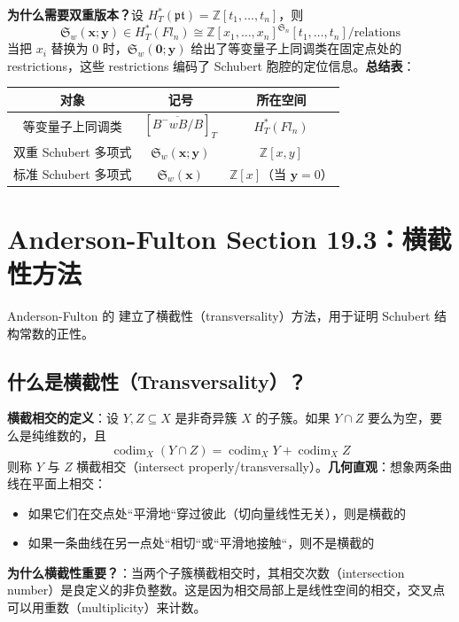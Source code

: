 \textbf{为什么需要双重版本？}设 $H_T^*(\mathfrak{pt}) = \mathbb{Z}[t_1, \ldots, t_n]$，则$$\mathfrak{S}_w(\mathbf{x}; \mathbf{y}) \in H_T^*(Fl_n) \cong \mathbb{Z}[x_1, \ldots, x_n]^{\mathfrak{S}_n}[t_1, \ldots, t_n] / \text{relations}$$当把 $x_i$ 替换为 $0$ 时，$\mathfrak{S}_w(\mathbf{0}; \mathbf{y})$ 给出了等变量子上同调类在固定点处的 restrictions，这些 restrictions 编码了 Schubert 胞腔的定位信息。\textbf{总结表}：
\begin{center}
\begin{tabular}{c|c|c}对象 & 记号 & 所在空间 \\ \hline 等变量子上同调类 & $[\overline{B^-wB/B}]_T$ & $H_T^*(Fl_n)$ \\ 双重 Schubert 多项式 & $\mathfrak{S}_w(\mathbf{x}; \mathbf{y})$ & $\mathbb{Z}[x,y]$ \\标准 Schubert 多项式 & $\mathfrak{S}_w(\mathbf{x})$ & $\mathbb{Z}[x]$（当 $\mathbf{y}=0$）
\end{tabular}
\end{center}
\section{Anderson-Fulton Section 19.3：横截性方法}\label{sec:AndersonFulton19-3}Anderson-Fulton 的 \cite[Section 19.3]{anderson2023} 建立了横截性（transversality）方法，用于证明 Schubert 结构常数的正性。
\subsection{什么是横截性（Transversality）？}\textbf{横截相交的定义}：设 $Y, Z \subseteq X$ 是非奇异簇 $X$ 的子簇。如果 $Y \cap Z$ 要么为空，要么是纯维数的，且$$\operatorname{codim}_X(Y \cap Z) = \operatorname{codim}_X Y + \operatorname{codim}_X Z$$则称 $Y$ 与 $Z$ 横截相交（intersect properly/transversally）。\textbf{几何直观}：想象两条曲线在平面上相交：
\begin{itemize}
\item 如果它们在交点处``平滑地``穿过彼此（切向量线性无关），则是横截的\item 如果一条曲线在另一点处``相切``或``平滑地接触``，则不是横截的
\end{itemize}

\textbf{为什么横截性重要？}：当两个子簇横截相交时，其相交次数（intersection number）是良定义的非负整数。这是因为相交局部上是线性空间的相交，交叉点可以用重数（multiplicity）来计数。
